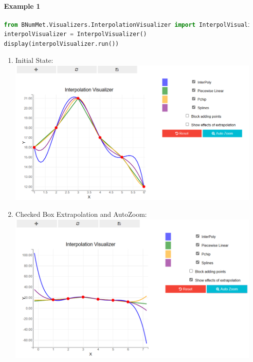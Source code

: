 \paragraph{Example 1}
\begin{lstlisting}[language=Python]
from BNumMet.Visualizers.InterpolationVisualizer import InterpolVisualizer
interpolVisualizer = InterpolVisualizer()
display(interpolVisualizer.run())
\end{lstlisting}
\begin{enumerate}
\item Initial State: \\
\includegraphics[scale=0.5]{Include/Images/Thesis/Documentation/Visualizers/Interpolation/Example 1/Example 1 - 00 - Initial State.png}

\item Checked Box Extrapolation and AutoZoom: \\
\includegraphics[scale=0.5]{Include/Images/Thesis/Documentation/Visualizers/Interpolation/Example 1/Example 1 - 01 - Checked Box Extrapolation and AutoZoom.png}


\end{enumerate}
